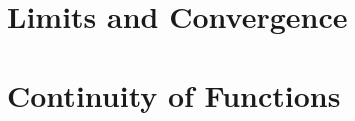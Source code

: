 \documentclass[british,11pt,a4paper]{report}
\begin{document}
\maketitle
\tableofcontents
\chapter{Limits and Convergence}

\chapter{Continuity of Functions}

\end{document}
